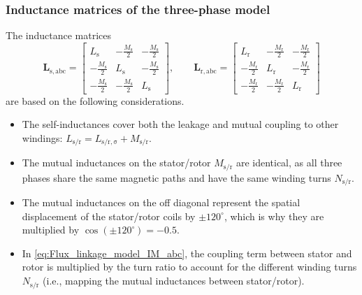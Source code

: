 \begin{frame}
	\frametitle{Inductance matrices of the three-phase model}
    The inductance matrices
    $$\renewcommand*{\arraystretch}{1.15} 
    \bm{L}_\mathrm{s,abc} = \begin{bmatrix}
        L_\mathrm{s} & -\frac{M_\mathrm{s}}{2} & -\frac{M_\mathrm{s}}{2}\\
        -\frac{M_\mathrm{s}}{2} & L_\mathrm{s} & -\frac{M_\mathrm{s}}{2}\\
        -\frac{M_\mathrm{s}}{2} & -\frac{M_\mathrm{s}}{2} & L_\mathrm{s}
    \end{bmatrix}, \qquad  \bm{L}_\mathrm{r,abc} = \begin{bmatrix}
        L_\mathrm{r} & -\frac{M_\mathrm{r}}{2} & -\frac{M_\mathrm{r}}{2}\\
        -\frac{M_\mathrm{r}}{2} & L_\mathrm{r} & -\frac{M_\mathrm{r}}{2}\\
        -\frac{M_\mathrm{r}}{2} & -\frac{M_\mathrm{r}}{2} & L_\mathrm{r}
    \end{bmatrix}$$
    are based on the following considerations. 
    \begin{itemize}
        \item The self-inductances cover both the leakage and mutual coupling to other windings: $L_\mathrm{s/r}=L_\mathrm{s/r, \sigma} + M_\mathrm{s/r}$.
        \item The mutual inductances on the stator/rotor $M_\mathrm{s/r}$ are identical, as all three phases share the same magnetic paths and have the same winding turns $N_\mathrm{s/r}$.
        \item The mutual inductances on the off diagonal represent the spatial displacement of the stator/rotor coils by $\pm 120^\circ$, which is why they are multiplied by $\cos(\pm 120^\circ)=-0.5$.
        \item In \eqref{eq:Flux_linkage_model_IM_abc}, the coupling term between stator and rotor is multiplied by the turn ratio to account for the different winding turns $N_\mathrm{s/r}$ (i.e., mapping the mutual inductances between stator/rotor).
    \end{itemize}
\end{frame}


